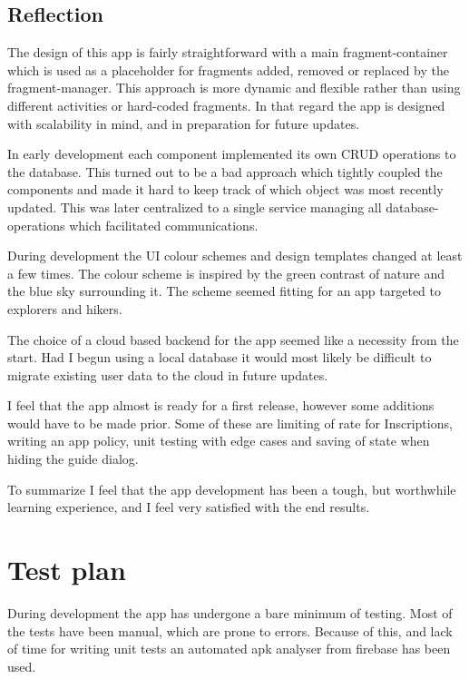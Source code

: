 \documentclass[]{article}
\begin{document}
\begin{flushleft}
\left\subsection{Reflection}

The design of this app is fairly straightforward with a main fragment-container which is used as a placeholder for fragments added, removed or replaced by the fragment-manager. This approach is more dynamic and flexible rather than using different activities or hard-coded fragments. In that regard the app is designed with scalability in mind, and in preparation for future updates.\medskip

In early development each component implemented its own CRUD operations to the database. This turned out to be a bad approach which tightly coupled the components and made it hard to keep track of which object was most recently updated. This was later centralized to a single service managing all database-operations which facilitated communications.\medskip

During development the UI colour schemes and design templates changed at least a few times. The colour scheme is inspired by the green contrast of nature and the blue sky surrounding it. The scheme seemed fitting for an app targeted to explorers and hikers.\medskip

The choice of a cloud based backend for the app seemed like a necessity from the start. Had I begun using a local database it would most likely be difficult to migrate existing user data to the cloud in future updates.\medskip

I feel that the app almost is ready for a first release, however some additions would have to be made prior. Some of these are limiting of rate for Inscriptions, writing an app policy, unit testing with edge cases and saving of state when hiding the guide dialog.\medskip

To summarize I feel that the app development has been a tough, but worthwhile learning experience, and I feel very satisfied with the end results.

\newpage
\section{Test plan}

During development the app has undergone a bare minimum of testing. Most of the tests have been manual, which are prone to errors. Because of this, and lack of time for writing unit tests an automated apk analyser from firebase has been used.


\end{flushleft}
\end{document}
